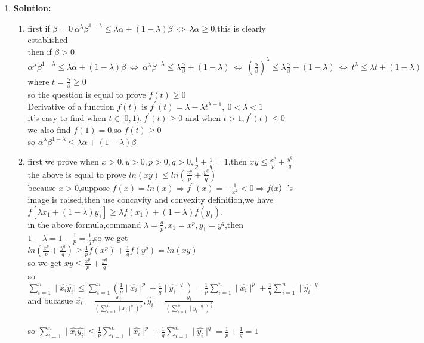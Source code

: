 \documentclass[english,onecolumn,UTF8]{IEEEtran}
\begin{document}
\begin{enumerate}
	
	\item \textbf{Solution:}
	\begin{enumerate}
	\item first if $\beta =0 \ \alpha^\lambda \beta^{1-\lambda}\leq \lambda\alpha+(1-\lambda)\beta
		\  \Leftrightarrow\   		\lambda\alpha \ge 0$,this is clearly established
		\\then if $\beta >0 $  $\alpha^\lambda \beta^{1-\lambda}\leq \lambda\alpha+(1-\lambda)\beta\ 
		\Leftrightarrow\  \alpha^\lambda 				\beta^{-\lambda}\leq \lambda \frac{\alpha}{\beta}+(1
		-\lambda)\  \Leftrightarrow\  (\frac{\alpha}{\beta})^{\lambda}\leq \lambda \frac{\alpha}{\beta}+(1-\lambda)
		\  \Leftrightarrow\  t^{\lambda}\leq \lambda t+(1-\lambda)$ where $t=\frac{\alpha}{\beta}\ge 0$ 
		\\so the question is equal to prove $f(t)\ge 0$
		\\Derivative of a function $f(t)$ is $f^{'}(t)=\lambda-\lambda t^{\lambda-1},\ 0<\lambda<1$
		\\it's easy to find when $t \in [0,1),f^{'}(t)\ge 0$ and when $t>1,f^{'}(t)\leq 0$
		\\we also find $f(1)=0$,so $f(t)\ge 0$
		\\so $\alpha^\lambda \beta^{1-\lambda}\leq \lambda\alpha+(1-\lambda)\beta$
	
	\item first we prove when $x>0,y>0,p>0,q>0,\frac{1}{p}+\frac{1}{q}=1$,then $xy\leq \frac{x^p}{p}+\frac{y^q}{q}$
		\\the above is equal to prove $ln(xy)\leq ln(\frac{x^p}{p}+\frac{y^q}{q})$
		\\because $x>0$,suppose $f(x)=ln(x) \Rightarrow f^{''}(x)= -\frac{1}{x^2}<0 \Rightarrow f(x）$'s image is 					raised,then use concavity and convexity definition,we have $f[\lambda x_1 +(1-\lambda)y_1]\ge \lambda
			f(x_1)+(1-\lambda)f(y_1)$.
		\\in the above formula,command $\lambda=\frac{a}{p},x_1=x^p,y_1=y^q$,then $1-\lambda=1-\frac{1}{p}=\frac{1}
			{q}$,so we get
		\\$ln(\frac{x^p}{p}+\frac{y^q}{q})\ge \frac{1}{p}f(x^p)+\frac{1}{q}f(y^q)=ln(xy)$
		\\so we get $xy\leq \frac{x^p}{p}+\frac{y^q}{q}$
		\\so $\sum_{i=1}^n \mid \hat{x_i}\hat{y_i} \mid \leq \sum_{i=1}^n ( \frac{1}{p} \mid \hat{x_i} \mid^p + 
			\frac{1}{q}\mid \hat{y_i} \mid^q ) = \frac{1}{p}\sum_{i=1}^n \mid \hat{x_i} \mid^p  + \frac{1}{q}
			\sum_{i=1}^n \mid \hat{y_i} \mid^q $
		\\and bucasue $\hat{x_i}=\frac{x_i}{(\sum_{i=1}^n \mid {x_i} \mid^p)^\frac{1}{p}},\hat{y_i}=
			\frac{y_i}{(\sum_{i=1}^n \mid {y_i} \mid^q)^\frac{1}{q}}$\\
		\\so $\sum_{i=1}^n \mid \hat{x_i}\hat{y_i} \mid \leq \frac{1}{p}\sum_{i=1}^n \mid \hat{x_i} \mid^p  +
			\frac{1}{q}\sum_{i=1}^n \mid \hat{y_i} \mid^q 
			=\frac{1}{p}+\frac{1}{q}=1$



\end{enumerate}
\end{enumerate}
\end{document}
